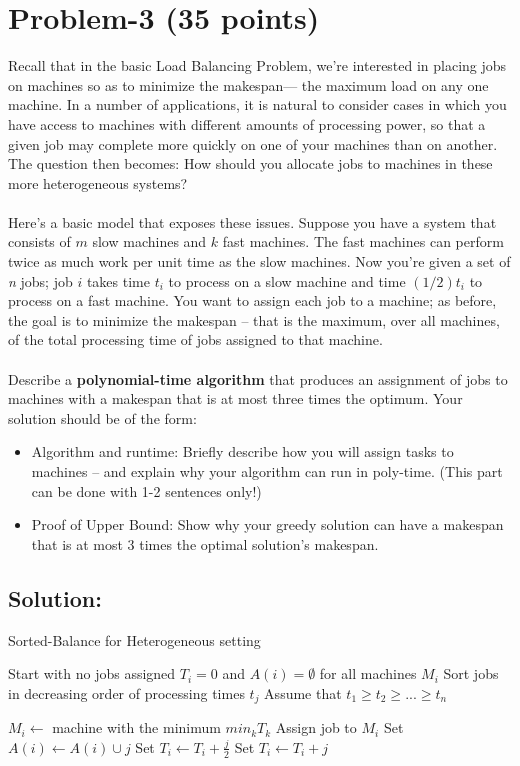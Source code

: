 \documentclass[11pt]{article}
\begin{document}
\newpage
\section*{Problem-3 (35 points)}
Recall that in the basic Load Balancing Problem, we’re interested in placing jobs on machines so as to minimize the makespan— the maximum load on any one machine. In a number of applications, it is natural to consider cases in which you have access to machines with different amounts of processing power, so that a given job may complete more quickly on one of your machines than on another. The question then becomes: How should you allocate jobs to machines in these more heterogeneous systems?
\\ \\
Here’s a basic model that exposes these issues. Suppose you have a system that consists of $m$ slow machines and $k$ fast machines. The fast machines can perform twice as much work per unit time as the slow machines. Now you’re given a set of \textit{n} jobs; job $i$ takes time $\mathit{t_i}$ to process on a slow machine and time $\mathit{(1/2)t_i}$ to process on a fast machine. You want to assign each job to a machine; as before, the goal is to minimize the makespan -- that is the maximum, over all machines, of the total processing time of jobs assigned to that machine.
\\ \\
Describe a \textbf{polynomial-time algorithm} that produces an assignment of jobs to machines with a makespan that is at most three times the optimum. Your solution should be of the form:
\begin{itemize}
    \item Algorithm and runtime: Briefly describe how you will assign tasks to machines -- and explain why your algorithm can run in poly-time. (This part can be done with 1-2 sentences only!)
    \item Proof of Upper Bound: Show why your greedy solution can have a makespan that is at most 3 times the optimal solution's makespan.
\end{itemize}

\subsection*{Solution:}
\begin{algorithm}
    \caption{Sorted-Balance for Heterogeneous setting}
    \begin{algorithmic}[1]
        \STATE Start with no jobs assigned
        \STATE $T_i = 0$ and $A(i)=\emptyset$ for all machines $M_i$
        \STATE Sort jobs in decreasing order of processing times $t_j$
        \STATE Assume that $t_1 \geq t_2 \geq ... \geq t_n$

            \STATE $M_i \gets $ machine with the minimum $min_k T_k$
            \STATE Assign job to $M_i$
            \STATE Set $A(i) \gets A(i) \cup {j}$
                \STATE Set $T_i \gets T_i + \frac{j}{2}$
            \ELSE
                \STATE Set $T_i \gets T_i + j$
            \ENDIF
        \ENDFOR
    \end{algorithmic}
\end{algorithm}
\end{document}
